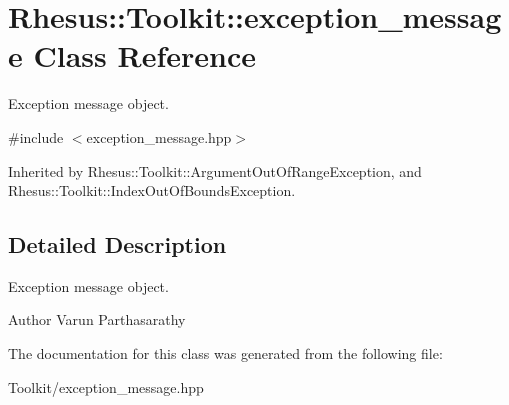 \hypertarget{class_rhesus_1_1_toolkit_1_1exception__message}{\section{Rhesus\-:\-:Toolkit\-:\-:exception\-\_\-message Class Reference}
\label{class_rhesus_1_1_toolkit_1_1exception__message}
}


Exception message object.  




{\ttfamily \#include $<$exception\-\_\-message.\-hpp$>$}



Inherited by Rhesus\-::\-Toolkit\-::\-Argument\-Out\-Of\-Range\-Exception, and Rhesus\-::\-Toolkit\-::\-Index\-Out\-Of\-Bounds\-Exception.



\subsection{Detailed Description}
Exception message object. 

\begin{DoxyAuthor}{Author}
Varun Parthasarathy 
\end{DoxyAuthor}


The documentation for this class was generated from the following file\-:\begin{DoxyCompactItemize}
\item 
Toolkit/exception\-\_\-message.\-hpp\end{DoxyCompactItemize}
